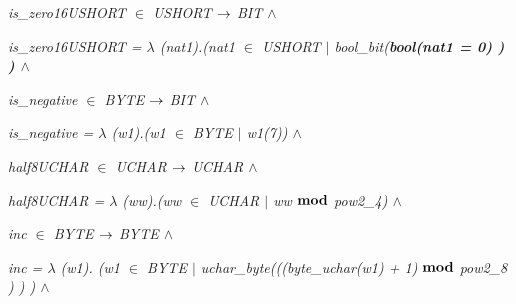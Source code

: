 \documentclass[11pt]{article}
\begin{document}
\begin{sloppypar}
\hspace*{0.20in}

\hspace*{0.20in}\it is\_zero16USHORT  $\in$  \it USHORT  $\fun$  \it BIT  $\land$ 

\hspace*{0.20in}\it is\_zero16USHORT \rm =  $\lambda$ \rm (\it nat1\rm )\rm .\rm (\it nat1  $\in$  \it USHORT  $\mid$  \it bool\_bit\rm (\bf bool\rm (\it nat1 \rm = \rm 0\hspace*{0.10in}\rm ) \rm ) \rm )  $\land$ 

\hspace*{0.20in}

\hspace*{0.20in}\it is\_negative  $\in$  \it BYTE  $\fun$  \it BIT  $\land$ 

\hspace*{0.20in}\it is\_negative \rm =  $\lambda$ \rm (\it w1\rm )\rm .\rm (\it w1  $\in$  \it BYTE  $\mid$ \hspace*{0.10in}\it w1\rm (\rm 7\rm )\hspace*{0.10in}\rm ) $\land$ 

\hspace*{0.20in}

\hspace*{0.20in}

\hspace*{0.20in}\it half8UCHAR  $\in$  \it UCHAR  $\fun$  \it UCHAR  $\land$ 

\hspace*{0.20in}\it half8UCHAR \rm =  $\lambda$  \rm (\it ww\rm )\rm .\rm (\it ww  $\in$  \it UCHAR  $\mid$  \it ww  $\mod$  \it pow2\_4\rm )  $\land$ \hspace*{0.20in}

\hspace*{0.20in}

\hspace*{0.20in}\it inc  $\in$ \hspace*{0.10in}\it BYTE\hspace*{0.10in} $\fun$  \it BYTE  $\land$ 

\hspace*{0.20in}\it inc \rm =  $\lambda$  \rm (\it w1\rm )\rm . \rm (\it w1  $\in$  \it BYTE  $\mid$  \it uchar\_byte\rm (\rm (\rm (\it byte\_uchar\rm (\it w1\rm ) \rm + \rm 1\rm )\hspace*{0.10in} $\mod$  \it pow2\_8 \rm ) \rm ) \rm )  $\land$ 

\hspace*{0.20in}


\end{sloppypar}
\end{document}
